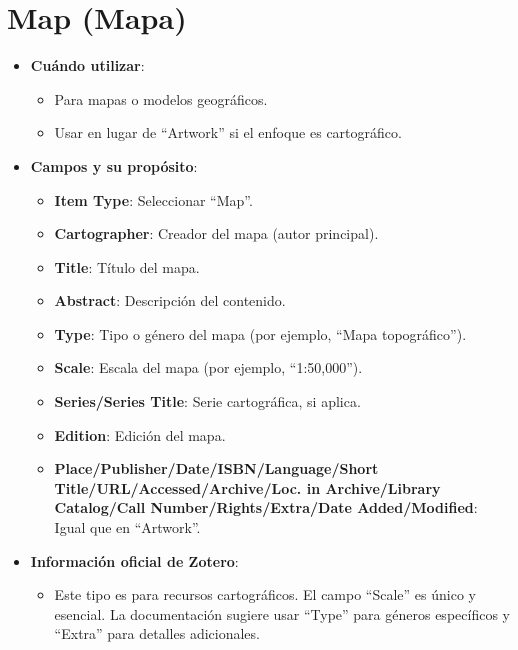 \documentclass[
  jou,
  floatsintext,
  longtable,
  a4paper,
  nolmodern,
  notxfonts,
  notimes,
  12pt,
  colorlinks=true,linkcolor=blue,citecolor=blue,urlcolor=blue]{apa7}
\providecommand{\tightlist}{%
  \setlength{\itemsep}{0pt}\setlength{\parskip}{0pt}}
\begin{document}
\section{Map (Mapa)}\label{map-mapa}

\begin{itemize}
\tightlist
\item
  \textbf{Cuándo utilizar}:

  \begin{itemize}
  \tightlist
  \item
    Para mapas o modelos geográficos.
  \item
    Usar en lugar de ``Artwork'' si el enfoque es cartográfico.
  \end{itemize}
\item
  \textbf{Campos y su propósito}:

  \begin{itemize}
  \tightlist
  \item
    \textbf{Item Type}: Seleccionar ``Map''.
  \item
    \textbf{Cartographer}: Creador del mapa (autor principal).
  \item
    \textbf{Title}: Título del mapa.
  \item
    \textbf{Abstract}: Descripción del contenido.
  \item
    \textbf{Type}: Tipo o género del mapa (por ejemplo, ``Mapa
    topográfico'').
  \item
    \textbf{Scale}: Escala del mapa (por ejemplo, ``1:50,000'').
  \item
    \textbf{Series/Series Title}: Serie cartográfica, si aplica.
  \item
    \textbf{Edition}: Edición del mapa.
  \item
    \textbf{Place/Publisher/Date/ISBN/Language/Short
    Title/URL/Accessed/Archive/Loc. in Archive/Library Catalog/Call
    Number/Rights/Extra/Date Added/Modified}: Igual que en ``Artwork''.
  \end{itemize}
\item
  \textbf{Información oficial de Zotero}:

  \begin{itemize}
  \tightlist
  \item
    Este tipo es para recursos cartográficos. El campo ``Scale'' es
    único y esencial. La documentación sugiere usar ``Type'' para
    géneros específicos y ``Extra'' para detalles adicionales.
  \end{itemize}
\end{itemize}
\end{document}
